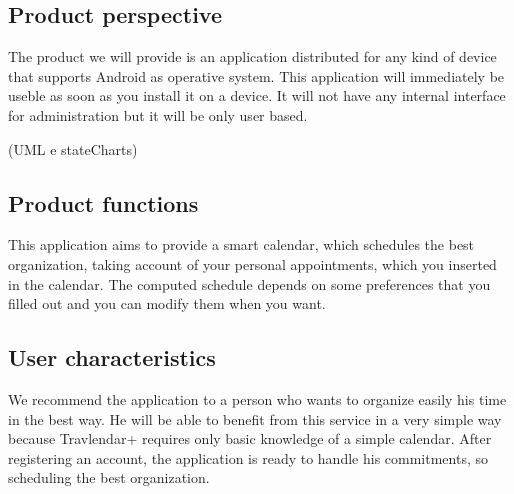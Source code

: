 \subsection{Product perspective} 
The product we will provide is an application distributed for any kind of device that supports Android as operative system. This application will immediately be useble as soon as you install it on a device.
It will not have any internal interface for administration but it will be only user based.

\begin{figure}[!h]
	\centering
\end{figure}

(UML e stateCharts)

\subsection{Product functions}
This application aims to provide a smart calendar, which schedules the best organization, taking account of your personal appointments, which you inserted in the calendar. The computed schedule depends on some preferences that you filled out and you can modify them when you want.
\subsection{User characteristics}
We recommend the application to a person who wants to organize easily his time in the best way. He will be able to benefit from this service in a very simple way because Travlendar+ requires only basic knowledge of a simple calendar. After registering an account, the application is ready to handle his commitments, so scheduling the best organization.
